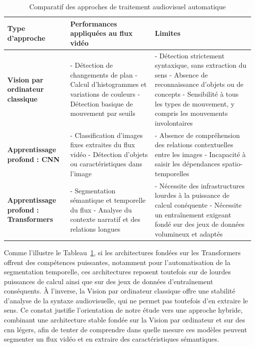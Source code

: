 \begin{table}[H]
	\centering
	\small
	\renewcommand{\arraystretch}{1.3} %
	\begin{tabular}{|p{3.6cm}|p{6.2cm}|p{6.2cm}|} %
		\hline
		\textbf{Type d'approche} & \textbf{Performances appliquées au flux vidéo} & \textbf{Limites} \\
		\hline
		\textbf{Vision par ordinateur classique} 
		& - Détection de changements de plan \newline
		  - Calcul d'histogrammes et variations de couleurs \newline
		  - Détection basique de mouvement par seuils
		& - Détection strictement syntaxique, sans extraction du sens \newline
		  - Absence de reconnaissance d'objets ou de concepts \newline
		  - Sensibilité à tous les types de mouvement, y compris les mouvements involontaires \\
		\hline
		\textbf{Apprentissage profond : CNN} 
		& - Classification d'images fixes extraites du flux vidéo \newline
		  - Détection d'objets ou caractéristiques dans l'image
		& - Absence de compréhension des relations contextuelles entre les images \newline
		  - Incapacité à saisir les dépendances spatio-temporelles \\
		\hline
		\textbf{Apprentissage profond : Transformers} 
		& - Segmentation sémantique et temporelle du flux \newline
		  - Analyse du contexte narratif et des relations longues
		& - Nécessite des infrastructures lourdes à la puissance de calcul conéquente \newline
		  - Nécessite un entraînement exigeant fondé sur des jeux de données volumineux et adaptés \\
		\hline
	\end{tabular}
	\caption{Comparatif des approches de traitement audiovisuel automatique}
	\label{tab:comparatif_avp}
\end{table}

Comme l'illustre le Tableau~\ref{tab:comparatif_avp}, si les architectures fondées sur les \gls{Transformers} offrent des compétences puissantes, notamment pour l'automatisation de la segmentation temporelle, ces architectures reposent toutefois sur de lourdes puissances de calcul ainsi que sur des jeux de données d'entraînement conséquents. À l'inverse, la \gls{Vision par ordinateur} classique offre une stabilité d'analyse de la syntaxe audiovisuelle, qui ne permet pas toutefois d'en extraire le sens. Ce constat justifie l'orientation de notre étude vers une approche hybride, combinant une architecture stable fondée sur la \gls{Vision par ordinateur} et sur des \gls{cnn} légers, afin de tenter de comprendre dans quelle mesure ces modèles peuvent segmenter un flux vidéo et en extraire des caractéristiques sémantiques.

